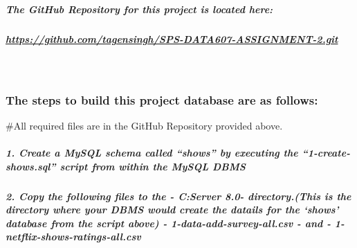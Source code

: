 \documentclass[
]{article}
\begin{document}
~

\hypertarget{the-github-repository-for-this-project-is-located-here}{%
\subparagraph{\texorpdfstring{\textbf{The GitHub Repository for this
project is located
here:}}{The GitHub Repository for this project is located here:}}\label{the-github-repository-for-this-project-is-located-here}}

\hypertarget{httpsgithub.comtagensinghsps-data607-assignment-2.git}{%
\subparagraph{\texorpdfstring{\url{https://github.com/tagensingh/SPS-DATA607-ASSIGNMENT-2.git}}{https://github.com/tagensingh/SPS-DATA607-ASSIGNMENT-2.git}}\label{httpsgithub.comtagensinghsps-data607-assignment-2.git}}

~

\hypertarget{the-steps-to-build-this-project-database-are-as-follows}{%
\subsubsection{\texorpdfstring{\textbf{The steps to build this project
database are as
follows:}}{The steps to build this project database are as follows:}}\label{the-steps-to-build-this-project-database-are-as-follows}}

\#All required files are in the GitHub Repository provided above.

\hypertarget{create-a-mysql-schema-called-shows-by-executing-the-1-create-shows.sql-script-from-within-the-mysql-dbms}{%
\subparagraph{\texorpdfstring{1. Create a MySQL schema called
\textbf{``shows''} by executing the \textbf{``1-create-shows.sql''}
script from within the MySQL
DBMS}{1. Create a MySQL schema called ``shows'' by executing the ``1-create-shows.sql'' script from within the MySQL DBMS}}\label{create-a-mysql-schema-called-shows-by-executing-the-1-create-shows.sql-script-from-within-the-mysql-dbms}}

\hypertarget{copy-the-following-files-to-the---cserver-8.0--directory.this-is-the-directory-where-your-dbms-would-create-the-datails-for-the-shows-database-from-the-script-above---1-data-add-survey-all.csv---and---1-netflix-shows-ratings-all.csv}{%
\subparagraph{\texorpdfstring{2. Copy the following files to the -
C:\ProgramData\MySQL\MySQL Server 8.0\Data\shows- directory.(This is the
directory where your DBMS would create the datails for the `shows'
database from the script above) - \textbf{1-data-add-survey-all.csv} -
and -
\textbf{1-netflix-shows-ratings-all.csv}}{2. Copy the following files to the - C:Server 8.0- directory.(This is the directory where your DBMS would create the datails for the `shows' database from the script above) - 1-data-add-survey-all.csv - and - 1-netflix-shows-ratings-all.csv}}\label{copy-the-following-files-to-the---cserver-8.0--directory.this-is-the-directory-where-your-dbms-would-create-the-datails-for-the-shows-database-from-the-script-above---1-data-add-survey-all.csv---and---1-netflix-shows-ratings-all.csv}}
\end{document}
